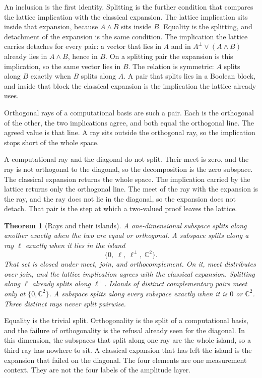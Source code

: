 \documentclass[a4paper]{article}
\newtheorem{theorem}{Theorem}[section]
\theoremstyle{definition}
\begin{document}
An inclusion is the first identity. Splitting is the further condition
that compares the lattice implication with the classical expansion. The
lattice implication sits inside that expansion, because \(A\wedge B\)
sits inside \(B\). Equality is the splitting, and detachment of the
expansion is the same condition. The implication the lattice carries
detaches for every pair: a vector that lies in \(A\) and in
\(A^\perp\vee(A\wedge B)\) already lies in \(A\wedge B\), hence in \(B\).
On a splitting pair the expansion is this implication, so the same
vector lies in \(B\). The relation is symmetric: \(A\) splits along
\(B\) exactly when \(B\) splits along \(A\). A pair that splits lies in
a Boolean block, and inside that block the classical expansion is the
implication the lattice already uses.

Orthogonal rays of a computational basis are such a pair. Each is the
orthogonal of the other, the two implications agree, and both equal the
orthogonal line. The agreed value is that line. A ray sits outside the
orthogonal ray, so the implication stops short of the whole space.

A computational ray and the diagonal do not split. Their meet is zero,
and the ray is not orthogonal to the diagonal, so the decomposition is
the zero subspace. The classical expansion returns the whole space. The
implication carried by the lattice returns only the orthogonal line.
The meet of the ray with the expansion is the ray, and the ray does not
lie in the diagonal, so the expansion does not detach. That pair is the
step at which a two-valued proof leaves the lattice.

\begin{theorem}[Rays and their islands]
\label{thm:island}
A one-dimensional subspace splits along another exactly when the two
are equal or orthogonal. A subspace splits along a ray \(\ell\) exactly
when it lies in the island
\[
\{0,\;\ell,\;\ell^\perp,\;\mathbb{C}^2\}.
\]
That set is closed under meet, join, and orthocomplement. On it, meet
distributes over join, and the lattice implication agrees with the
classical expansion. Splitting along \(\ell\) already splits along
\(\ell^\perp\). Islands of distinct complementary pairs meet only at
\(\{0,\mathbb{C}^2\}\). A subspace splits along every subspace exactly
when it is \(0\) or \(\mathbb{C}^2\). Three distinct rays never split
pairwise.
\end{theorem}

Equality is the trivial split. Orthogonality is the split of a
computational basis, and the failure of orthogonality is the refusal
already seen for the diagonal. In this dimension, the subspaces that
split along one ray are the whole island, so a third ray has nowhere
to sit. A classical expansion that has left the island is the expansion
that failed on the diagonal. The four elements are one measurement
context. They are not the four labels of the amplitude layer.
\end{document}
